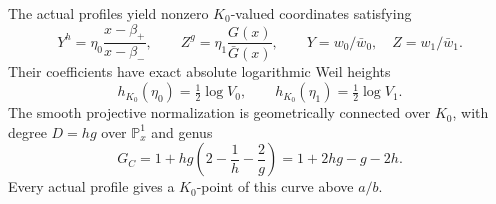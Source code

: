 \begin{theorem}
\label{dc-cover}
The actual profiles yield nonzero $K_0$-valued coordinates satisfying
\begin{equation}\label{dc-kummer-equations}
 Y^h=\eta_0\frac{x-\beta_+}{x-\beta_-},\qquad
 Z^g=\eta_1\frac{G(x)}{\bar G(x)},\qquad
 Y=w_0/\bar w_0,\quad Z=w_1/\bar w_1.
\end{equation}
Their coefficients have exact absolute logarithmic Weil heights
\begin{equation}\label{dc-exact-height}
 h_{K_0}(\eta_0)=\tfrac12\log V_0,\qquad
 h_{K_0}(\eta_1)=\tfrac12\log V_1.
\end{equation}
The smooth projective normalization is geometrically connected over
$K_0$, with degree $D=hg$ over $\mathbb P^1_x$ and genus
\begin{equation}\label{dc-genus}
 G_C=1+hg\left(2-\frac1h-\frac2g\right)
     =1+2hg-g-2h.
\end{equation}
Every actual profile gives a $K_0$-point of this curve above $a/b$.
\end{theorem}
